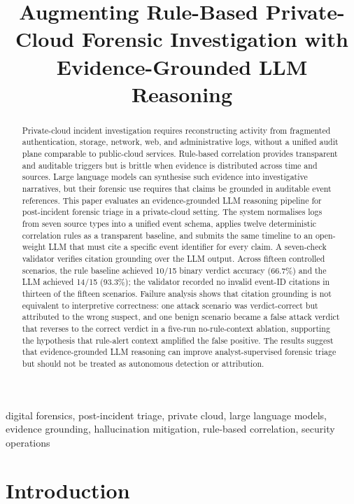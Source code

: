 \documentclass[conference]{IEEEtran}
\title{Augmenting Rule-Based Private-Cloud Forensic Investigation with Evidence-Grounded LLM Reasoning}
\author{%
  \IEEEauthorblockN{Md.~Nazmul Hasan}
  \IEEEauthorblockA{\textit{Department of Computer Science} \\
  \textit{Institution} \\
  City, Country \\
  email@example.com}
}
\begin{document}
\maketitle

\begin{abstract}
Private-cloud incident investigation requires reconstructing activity from fragmented authentication, storage, network, web, and administrative logs, without a unified audit plane comparable to public-cloud services. Rule-based correlation provides transparent and auditable triggers but is brittle when evidence is distributed across time and sources. Large language models can synthesise such evidence into investigative narratives, but their forensic use requires that claims be grounded in auditable event references. This paper evaluates an evidence-grounded LLM reasoning pipeline for post-incident forensic triage in a private-cloud setting. The system normalises logs from seven source types into a unified event schema, applies twelve deterministic correlation rules as a transparent baseline, and submits the same timeline to an open-weight LLM that must cite a specific event identifier for every claim. A seven-check validator verifies citation grounding over the LLM output. Across fifteen controlled scenarios, the rule baseline achieved 10/15 binary verdict accuracy (66.7\%) and the LLM achieved 14/15 (93.3\%); the validator recorded no invalid event-ID citations in thirteen of the fifteen scenarios. Failure analysis shows that citation grounding is not equivalent to interpretive correctness: one attack scenario was verdict-correct but attributed to the wrong suspect, and one benign scenario became a false attack verdict that reverses to the correct verdict in a five-run no-rule-context ablation, supporting the hypothesis that rule-alert context amplified the false positive. The results suggest that evidence-grounded LLM reasoning can improve analyst-supervised forensic triage but should not be treated as autonomous detection or attribution.
\end{abstract}

\begin{IEEEkeywords}
digital forensics, post-incident triage, private cloud, large language models, evidence grounding, hallucination mitigation, rule-based correlation, security operations
\end{IEEEkeywords}

\section{Introduction}
\label{sec:intro}
\end{document}
